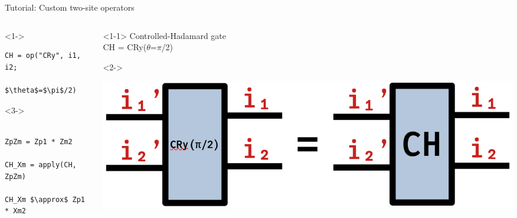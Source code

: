 \begin{frame}[fragile]{Tutorial: Custom two-site operators}

\begin{columns}

\begin{column}{5cm}

\begin{onlyenv}<1->
\begin{lstlisting}[language=JuliaLocal, style=julia, mathescape, basicstyle=\small]
CH = op("CRy", i1, i2;
             $\theta$=$\pi$/2)
\end{lstlisting}
\end{onlyenv}

\begin{onlyenv}<3->
~\\
~\\
\begin{lstlisting}[language=JuliaLocal, style=julia, mathescape, basicstyle=\small]
ZpZm = Zp1 * Zm2

CH_Xm = apply(CH, ZpZm)

CH_Xm $\approx$ Zp1 * Xm2
\end{lstlisting}
\end{onlyenv}

\end{column}

\begin{column}{5cm}

\begin{onlyenv}<1-1>
Controlled-Hadamard gate \\
CH = CRy($\theta$=$\pi$/2)
\end{onlyenv}

\begin{onlyenv}<2->
\vspace*{0.0cm}
\begin{center}
\includegraphics[width=1.0\textwidth]{
  slides/assets/CH12.png
}
\end{center}
\vspace*{0.0cm}
\end{onlyenv}


\end{column}
\end{columns}
\end{frame}
